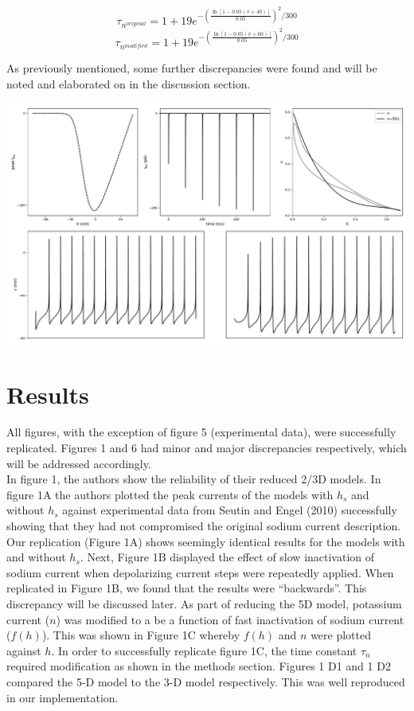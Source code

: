 \begin{center}
	$$\tau_{n^{original}} = 1 + 19 e^{- (\frac{{\ln[1 - 0.05 (v+40)]}}{0.05})^{2}/300}$$
	$$\tau_{n^{modified}} = 1 + 19 e^{- (\frac{{\ln[1 - 0.05 (v+60)]}}{0.05})^{2}/300}$$
\end{center}

As previously mentioned, some further discrepancies were found and will be noted and elaborated on in the discussion section. 

\includegraphics[scale=1]{../figures/figure_1.pdf}
\section{Results}

All figures, with the exception of figure 5 (experimental data), were successfully replicated. Figures 1 and 6 had minor and major discrepancies respectively, which will be addressed accordingly.\\  
In figure 1, the authors show the reliability of their reduced 2/3D models. In figure 1A the authors plotted the peak currents of the models with $h_{s}$ and without $h_{s}$ against experimental data from Seutin and Engel (2010) successfully showing that they had not compromised the original sodium current description.  Our replication (Figure 1A) shows seemingly identical results for the models with and without $h_{s}$. Next, Figure 1B displayed the effect of slow inactivation of sodium current when depolarizing current steps were repeatedly applied. When replicated in Figure 1B, we found that the results were “backwards”. This discrepancy will be discussed later. As part of reducing the 5D model, potassium current ($n$) was modified to a be a function of fast inactivation of sodium current ($f(h)$). This was shown in Figure 1C whereby $f(h)$ and $n$ were plotted against $h$. In order to successfully replicate figure 1C, the time constant $\tau_n$ required modification as shown in the methods section. Figures 1 D1 and 1 D2 compared the 5-D model to the 3-D model respectively. This was well reproduced in our implementation.\\ 


